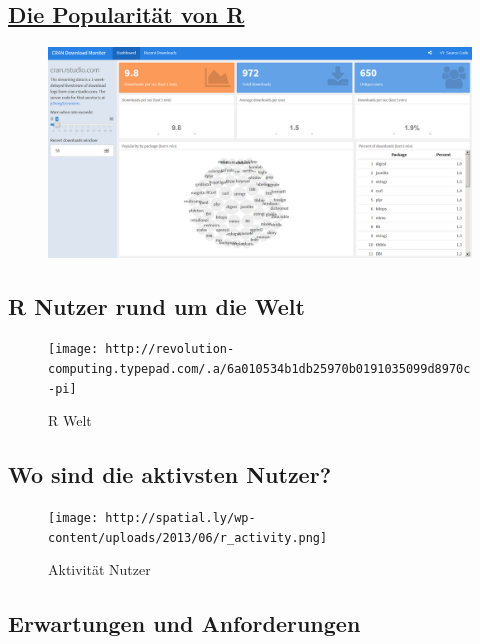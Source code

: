 \documentclass[]{article}
\begin{document}
\subsection{\texorpdfstring{\href{https://gallery.shinyapps.io/cran-gauge/}{Die
Popularität von R}}{Die Popularität von R}}\label{die-popularitat-von-r}

\begin{figure}[htbp]
\centering
\includegraphics{figure/CRANdownloads.PNG}
\caption{}
\end{figure}

\subsection{R Nutzer rund um die Welt}\label{r-nutzer-rund-um-die-welt}

\begin{figure}[htbp]
\centering
\texttt{[image: http://revolution-computing.typepad.com/.a/6a010534b1db25970b0191035099d8970c-pi]}
\caption{R Welt}
\end{figure}

\subsection{Wo sind die aktivsten
Nutzer?}\label{wo-sind-die-aktivsten-nutzer}

\begin{figure}[htbp]
\centering
\texttt{[image: http://spatial.ly/wp-content/uploads/2013/06/r\_activity.png]}
\caption{Aktivität Nutzer}
\end{figure}

\subsection{Erwartungen und
Anforderungen}\label{erwartungen-und-anforderungen}
\end{document}
